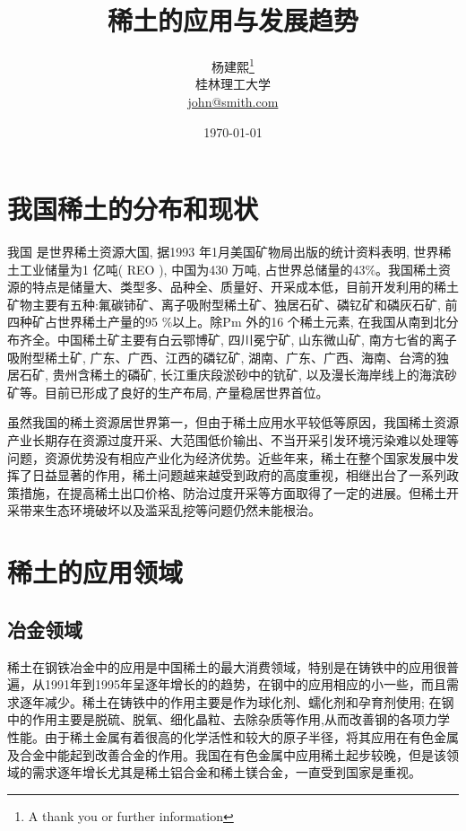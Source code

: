 \documentclass[twoside,twocolumn]{article}
\title{稀土的应用与发展趋势} %
\author{%
\textsc{杨建熙}\thanks{A thank you or further information} \\[1ex] %
\normalsize 桂林理工大学 \\ %
\normalsize \href{mailto:john@smith.com}{john@smith.com} %
}
\date{\today} %
\begin{document}
\maketitle


\section{我国稀土的分布和现状}

\lettrine[nindent=0em,lines=3]{我}{国}
是世界稀土资源大国, 据1993 年1月美国矿物局出版的统计资料表明, 世界稀土工业储量为1 亿吨( REO ), 中国为430 万吨, 占世界总储量的43$\%$。我国稀土资源的特点是储量大、类型多、品种全、质量好、开采成本低，目前开发利用的稀土矿物主要有五种:氟碳铈矿、离子吸附型稀土矿、独居石矿、磷钇矿和磷灰石矿, 前四种矿占世界稀土产量的95 $\%$以上。除Pm 外的16 个稀土元素, 在我国从南到北分布齐全。中国稀土矿主要有白云鄂博矿, 四川冕宁矿, 山东微山矿, 南方七省的离子吸附型稀土矿, 广东、广西、江西的磷钇矿, 湖南、广东、广西、海南、台湾的独居石矿, 贵州含稀土的磷矿, 长江重庆段淤砂中的钪矿, 以及漫长海岸线上的海滨砂矿等。目前已形成了良好的生产布局, 产量稳居世界首位。

虽然我国的稀土资源居世界第一，但由于稀土应用水平较低等原因，我国稀土资源产业长期存在资源过度开采、大范围低价输出、不当开采引发环境污染难以处理等问题，资源优势没有相应产业化为经济优势。近些年来，稀土在整个国家发展中发挥了日益显著的作用，稀土问题越来越受到政府的高度重视，相继出台了一系列政策措施，在提高稀土出口价格、防治过度开采等方面取得了一定的进展。但稀土开采带来生态环境破坏以及滥采乱挖等问题仍然未能根治。


\section{稀土的应用领域}

\subsection{冶金领域}
稀土在钢铁冶金中的应用是中国稀土的最大消费领域，特别是在铸铁中的应用很普遍，从1991年到1995年呈逐年增长的的趋势，在钢中的应用相应的小一些，而且需求逐年减少。稀土在铸铁中的作用主要是作为球化剂、蠕化剂和孕育剂使用; 在钢中的作用主要是脱硫、脱氧、细化晶粒、去除杂质等作用,从而改善钢的各项力学性能。由于稀土金属有着很高的化学活性和较大的原子半径，将其应用在有色金属及合金中能起到改善合金的作用。我国在有色金属中应用稀土起步较晚，但是该领域的需求逐年增长尤其是稀土铝合金和稀土镁合金，一直受到国家是重视。
\end{document}
